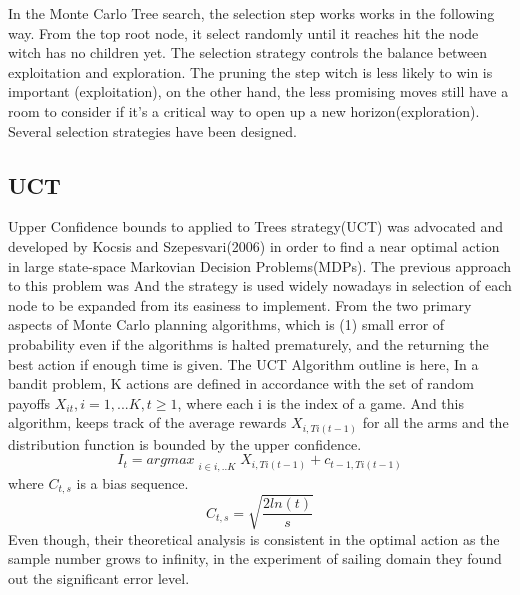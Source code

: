 \documentclass[12pt]{article}
\begin{document}
In the Monte Carlo Tree search, the selection step works works in the following way. From the top root node, it select randomly until it reaches hit the node witch has no children yet. The selection strategy controls the balance between exploitation and exploration. The pruning the step witch is less likely to win is important (exploitation), on the other hand, the less promising moves still have a room to consider if it’s a critical way to open up a new horizon(exploration). Several selection strategies have been designed.  
\subsection{UCT}
Upper Confidence bounds to applied to Trees strategy(UCT) was advocated and developed by Kocsis and Szepesvari(2006) in order to find a near optimal action in large state-space Markovian Decision Problems(MDPs)\cite{kocsis2006bandit}. The previous approach to this problem was 
And the strategy is used widely nowadays in selection of each node to be expanded from its easiness to implement.
From the two primary aspects of Monte Carlo planning algorithms, which is (1) small error of probability even if the algorithms is halted prematurely, and the returning the best action if enough time is given. The UCT Algorithm outline is here, In a bandit problem, K actions are defined in accordance with the set of random payoffs \(X_{it}, i = 1, ... K, t\geq 1\), where each i is the index of a game. And this algorithm, keeps track of the average rewards \(X_{i, Ti(t-1)}\) for all the arms and the distribution function is bounded by the upper confidence. 
\[ I_{t} = argmax_{\substack{i \in{i, .. K}}} {X_{i, Ti(t-1)} + c_{t-1, Ti(t-1)}}\]
where \(C_{t, s}\) is a bias sequence.
\[C_{t, s} = \sqrt{\frac{2ln(t)}{s}}\]
Even though, their theoretical analysis is consistent in the optimal action as the sample number grows to infinity, in the experiment of sailing domain they found out the significant error level. 
\end{document}

